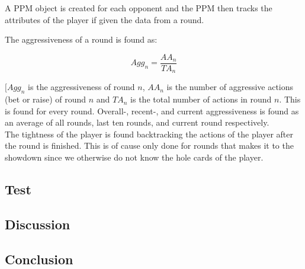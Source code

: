A PPM object is created for each opponent and the PPM then tracks the attributes of the player if given the data from a round.

The aggressiveness of a round is found as:

\[Agg_{n} = \frac{AA_{n}}{TA_{n}}\]

$[Agg_{n}$ is the aggressiveness of round $n$, $AA_{n}$ is the number of aggressive actions (bet or raise) of round $n$ and  $TA_{n}$ is the total number of actions in round $n$. This is found for every round. Overall-, recent-, and current aggressiveness is found as an average of all rounds, last ten rounds, and current round respectively.\\

The tightness of the player is found backtracking the actions of the player after the round is finished. This is of cause only done for rounds that makes it to the showdown since we otherwise do not know the hole cards of the player. 





\subsection{Test}


\subsection{Discussion}

\subsection{Conclusion}
